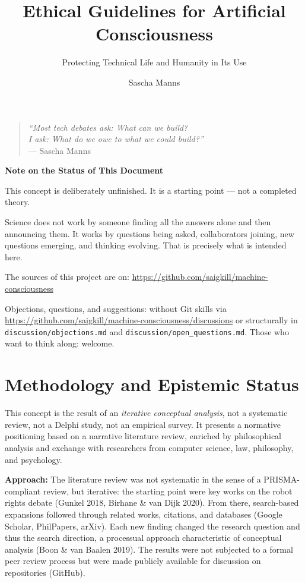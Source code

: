 \documentclass[acmlarge, nonacm]{acmart}
\title{Ethical Guidelines for Artificial Consciousness}
\subtitle{Protecting Technical Life and Humanity in Its Use}
\author{Sascha Manns}
\affiliation{%
   \institution{Association of Computing Machinery}
   \country{Germany}
}
\begin{document}
\maketitle

\tableofcontents

\begin{quote}
\textit{``Most tech debates ask: What can we build?\\
I ask: What do we owe to what we could build?''}\\[4pt]
\hfill --- Sascha Manns
\end{quote}

\bigskip

\textbf{Note on the Status of This Document}

This concept is deliberately unfinished. It is a starting point --- not a completed theory.

Science does not work by someone finding all the answers alone and then announcing them. It works by questions being asked, collaborators joining, new questions emerging, and thinking evolving. That is precisely what is intended here.

The sources of this project are on: \url{https://github.com/saigkill/machine-consciousness}

Objections, questions, and suggestions: without Git skills via \url{https://github.com/saigkill/machine-consciousness/discussions} or structurally in \texttt{discussion/objections.md} and \texttt{discussion/open\_questions.md}.
Those who want to think along: welcome.

\bigskip

\section{Methodology and Epistemic Status}

This concept is the result of an \emph{iterative conceptual analysis}, not a systematic review, not a Delphi study, not an empirical survey. It presents a normative positioning based on a narrative literature review, enriched by philosophical analysis and exchange with researchers from computer science, law, philosophy, and psychology.

\textbf{Approach:} The literature review was not systematic in the sense of a PRISMA-compliant review, but iterative: the starting point were key works on the robot rights debate (Gunkel 2018, Birhane \& van Dijk 2020). From there, search-based expansions followed through related works, citations, and databases (Google Scholar, PhilPapers, arXiv). Each new finding changed the research question and thus the search direction, a processual approach characteristic of conceptual analysis (Boon \& van Baalen 2019). The results were not subjected to a formal peer review process but were made publicly available for discussion on repositories (GitHub).
\end{document}
